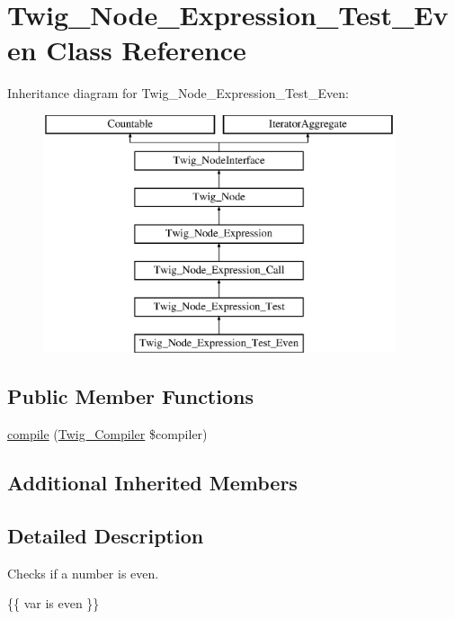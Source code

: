 \hypertarget{classTwig__Node__Expression__Test__Even}{}\section{Twig\+\_\+\+Node\+\_\+\+Expression\+\_\+\+Test\+\_\+\+Even Class Reference}
\label{classTwig__Node__Expression__Test__Even}
Inheritance diagram for Twig\+\_\+\+Node\+\_\+\+Expression\+\_\+\+Test\+\_\+\+Even\+:\begin{figure}[H]
\begin{center}
\leavevmode
\includegraphics[height=7.000000cm]{classTwig__Node__Expression__Test__Even}
\end{center}
\end{figure}
\subsection*{Public Member Functions}
\begin{DoxyCompactItemize}
\item 
\hyperlink{classTwig__Node__Expression__Test__Even_a39a12ae5000888db8a06d9b2665bcbab}{compile} (\hyperlink{classTwig__Compiler}{Twig\+\_\+\+Compiler} \$compiler)
\end{DoxyCompactItemize}
\subsection*{Additional Inherited Members}


\subsection{Detailed Description}
Checks if a number is even.


\begin{DoxyPre}
 \{\{ var is even \}\}
\end{DoxyPre}


